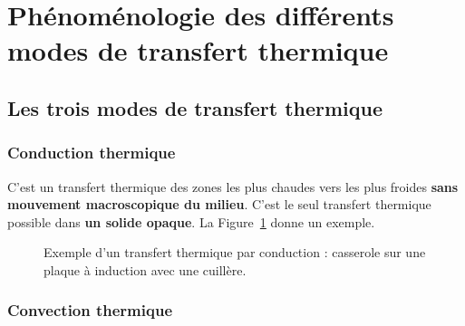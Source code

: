 \section{Phénoménologie des différents modes de transfert thermique}

    \subsection{Les trois modes de transfert thermique}

        \subsubsection{Conduction thermique}

            C'est un transfert thermique des zones les plus chaudes vers les plus froides \textbf{sans mouvement macroscopique du milieu}. C'est le seul transfert thermique possible dans \textbf{un solide opaque}. La Figure~\ref{fig:exemple_transfert_thermique_conduction} donne un exemple.

            \begin{figure}
                \centering
                \caption[Exemple d'un transfert thermique par conduction.]{Exemple d'un transfert thermique par conduction : casserole sur une plaque à induction avec une cuillère.}
                \label{fig:exemple_transfert_thermique_conduction}
            \end{figure}

        \subsubsection{Convection thermique}

